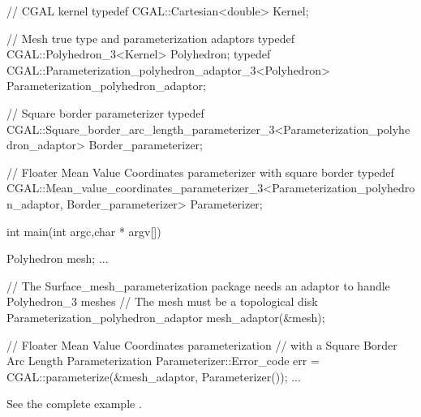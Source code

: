 \begin{ccExampleCode}

// CGAL kernel
typedef CGAL::Cartesian<double>                         Kernel;

// Mesh true type and parameterization adaptors
typedef CGAL::Polyhedron_3<Kernel>                      Polyhedron;
typedef CGAL::Parameterization_polyhedron_adaptor_3<Polyhedron>
                                                        Parameterization_polyhedron_adaptor;

// Square border parameterizer
typedef CGAL::Square_border_arc_length_parameterizer_3<Parameterization_polyhedron_adaptor>
                                                        Border_parameterizer;

// Floater Mean Value Coordinates parameterizer with square border
typedef CGAL::Mean_value_coordinates_parameterizer_3<Parameterization_polyhedron_adaptor,
                                                     Border_parameterizer>
                                                        Parameterizer;

int main(int argc,char * argv[])
{
    Polyhedron mesh;
    ...

    // The Surface_mesh_parameterization package needs an adaptor to handle Polyhedron_3 meshes
    // The mesh must be a topological disk
    Parameterization_polyhedron_adaptor mesh_adaptor(&mesh);

    // Floater Mean Value Coordinates parameterization
    // with a Square Border Arc Length Parameterization
    Parameterizer::Error_code err = CGAL::parameterize(&mesh_adaptor, Parameterizer());
    ...
}

\end{ccExampleCode}

See the complete example .
